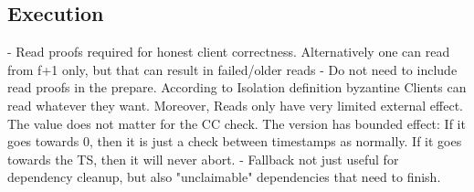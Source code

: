 \subsection{Execution}
- Read proofs required for honest client correctness. Alternatively one can read from f+1 only, but that can result in failed/older reads
- Do not need to include read proofs in the prepare. According to Isolation definition byzantine Clients can read whatever they want. Moreover, Reads only have very limited external effect. The value does not matter for the CC check. The version has bounded effect: If it goes towards 0, then it is just a check between timestamps as normally. If it goes towards the TS, then it will never abort.
- Fallback not just useful for dependency cleanup, but also "unclaimable" dependencies that need to finish.
